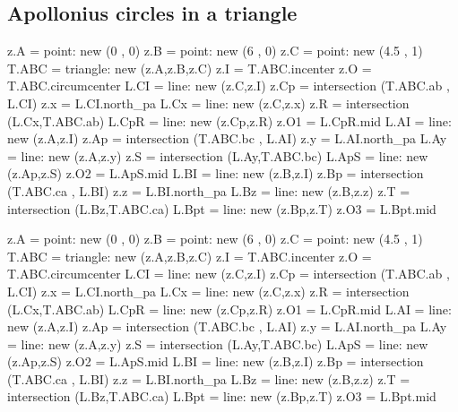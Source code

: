 \subsection{Apollonius circles in a triangle} %
\label{sub:apollonius_circles}


\begin{tkzexample}[latex=0cm,small,code only]
\begin{tkzelements}
   z.A   = point: new (0 , 0)
   z.B   = point: new (6 , 0)   
   z.C   = point: new (4.5 , 1)
   T.ABC = triangle: new (z.A,z.B,z.C)
   z.I   = T.ABC.incenter
   z.O   = T.ABC.circumcenter    
   L.CI  = line: new (z.C,z.I)
   z.Cp  = intersection (T.ABC.ab , L.CI)
   z.x   = L.CI.north_pa
   L.Cx  = line: new (z.C,z.x)
   z.R   = intersection (L.Cx,T.ABC.ab)
   L.CpR = line: new (z.Cp,z.R)
   z.O1  = L.CpR.mid   
   L.AI  = line: new (z.A,z.I)
   z.Ap  = intersection (T.ABC.bc , L.AI)
   z.y   = L.AI.north_pa
   L.Ay  = line: new (z.A,z.y)
   z.S   = intersection (L.Ay,T.ABC.bc)
   L.ApS = line: new (z.Ap,z.S)
   z.O2  = L.ApS.mid 
   L.BI  = line: new (z.B,z.I)
   z.Bp  = intersection (T.ABC.ca , L.BI)
   z.z   = L.BI.north_pa
   L.Bz  = line: new (z.B,z.z)
   z.T   = intersection (L.Bz,T.ABC.ca)
   L.Bpt = line: new (z.Bp,z.T)
   z.O3  = L.Bpt.mid
\end{tkzelements}
\end{tkzexample}

\begin{tkzelements}
z.A   = point: new (0 , 0)
z.B   = point: new (6 , 0)   
z.C   = point: new (4.5 , 1)
T.ABC = triangle: new (z.A,z.B,z.C)
z.I   = T.ABC.incenter
z.O   = T.ABC.circumcenter    
L.CI  = line: new (z.C,z.I)
z.Cp  = intersection (T.ABC.ab , L.CI)
z.x   = L.CI.north_pa
L.Cx  = line: new (z.C,z.x)
z.R   = intersection (L.Cx,T.ABC.ab)
L.CpR = line: new (z.Cp,z.R)
z.O1  = L.CpR.mid   
L.AI  = line: new (z.A,z.I)
z.Ap  = intersection (T.ABC.bc , L.AI)
z.y   = L.AI.north_pa
L.Ay  = line: new (z.A,z.y)
z.S   = intersection (L.Ay,T.ABC.bc)
L.ApS = line: new (z.Ap,z.S)
z.O2  = L.ApS.mid 
L.BI  = line: new (z.B,z.I)
z.Bp  = intersection (T.ABC.ca , L.BI)
z.z   = L.BI.north_pa
L.Bz  = line: new (z.B,z.z)
z.T   = intersection (L.Bz,T.ABC.ca)
L.Bpt = line: new (z.Bp,z.T)
z.O3  = L.Bpt.mid
\end{tkzelements}

